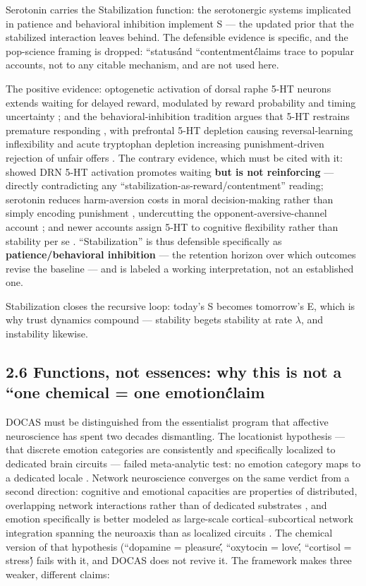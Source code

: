 \documentclass[
]{article}
\begin{document}
Serotonin carries the Stabilization function: the serotonergic systems
implicated in patience and behavioral inhibition implement S --- the
updated prior that the stabilized interaction leaves behind. The
defensible evidence is specific, and the pop-science framing is dropped:
``statusá́nd ``contentmentć́laims trace to popular accounts, not to any
citable mechanism, and are not used here.

The positive evidence: optogenetic activation of dorsal raphe 5-HT
neurons extends waiting for delayed reward, modulated by reward
probability and timing uncertainty ; and the behavioral-inhibition
tradition argues that 5-HT restrains premature responding , with
prefrontal 5-HT depletion causing reversal-learning inflexibility and
acute tryptophan depletion increasing punishment-driven rejection of
unfair offers . The contrary evidence, which must be cited with it:
showed DRN 5-HT activation promotes waiting \textbf{but is not
reinforcing} --- directly contradicting any
``stabilization-as-reward/contentment'' reading; serotonin reduces
harm-aversion costs in moral decision-making rather than simply encoding
punishment , undercutting the opponent-aversive-channel account ; and
newer accounts assign 5-HT to cognitive flexibility rather than
stability per se . ``Stabilization'' is thus defensible specifically as
\textbf{patience/behavioral inhibition} --- the retention horizon over
which outcomes revise the baseline --- and is labeled a working
interpretation, not an established one.

Stabilization closes the recursive loop: today's S becomes tomorrow's E,
which is why trust dynamics compound --- stability begets stability at
rate \(\lambda\), and instability likewise.

\subsection{2.6 Functions, not essences: why this is not a ``one
chemical = one
emotionć́laim}\label{functions-not-essences-why-this-is-not-a-one-chemical-one-emotionux107laim}

DOCAS must be distinguished from the essentialist program that affective
neuroscience has spent two decades dismantling. The locationist
hypothesis --- that discrete emotion categories are consistently and
specifically localized to dedicated brain circuits --- failed
meta-analytic test: no emotion category maps to a dedicated locale .
Network neuroscience converges on the same verdict from a second
direction: cognitive and emotional capacities are properties of
distributed, overlapping network interactions rather than of dedicated
substrates , and emotion specifically is better modeled as large-scale
cortical--subcortical network integration spanning the neuroaxis than as
localized circuits . The chemical version of that hypothesis (``dopamine
= pleasure,́́ ``oxytocin = love,́́ ``cortisol = stress)́́ fails with it, and
DOCAS does not revive it. The framework makes three weaker, different
claims:
\end{document}
